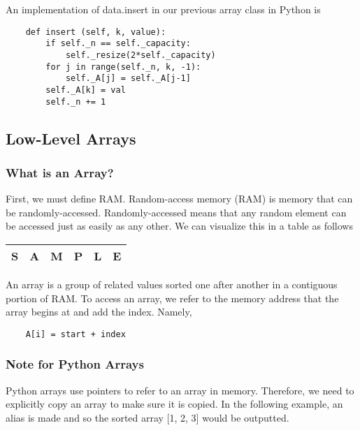 \documentclass[]{article}
\begin{document}
An implementation of data.insert in our previous array class in Python is

\begin{lstlisting}
	def insert (self, k, value):
		if self._n == self._capacity:
			self._resize(2*self._capacity)
		for j in range(self._n, k, -1):
			self._A[j] = self._A[j-1]
		self._A[k] = val
		self._n += 1
\end{lstlisting}

\subsection{Low-Level Arrays}\bigbreak

\subsubsection {What is an Array?}\bigbreak

First, we must define RAM. Random-access memory (RAM) is memory that can be randomly-accessed. Randomly-accessed means that any random element can be accessed just as easily as any other. We can visualize this in a table as follows\\

\begin{table}[H]\centering
	\begin{tabular}{|c|c|c|c|c|c|}\hline
		S & A & M & P & L & E \\\hline
	\end{tabular}\bigbreak
\end{table}

An array is a group of related values sorted one after another in a contiguous portion of RAM. To access an array, we refer to the memory address that the array begins at and add the index. Namely, \\

\begin{lstlisting}
	A[i] = start + index
\end{lstlisting}\bigbreak

\subsubsection{Note for Python Arrays}\bigbreak

Python arrays use pointers to refer to an array in memory. Therefore, we need to explicitly copy an array to make sure it is copied. In the following example, an alias is made and so the sorted array [1, 2, 3] would be outputted.
\end{document}
